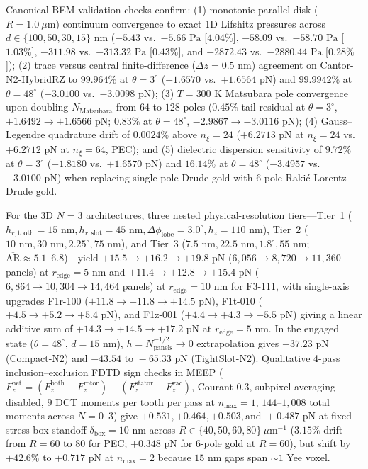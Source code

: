 \documentclass[11pt, a4paper]{article}
\begin{document}
Canonical BEM validation checks confirm: (1) monotonic parallel-disk ($R = 1.0\ \mu\text{m}$) continuum convergence to exact 1D Lifshitz pressures across $d \in \{100, 50, 30, 15\}\text{ nm}$ ($-5.43$ vs.\ $-5.66\text{ Pa}$ [$4.04\%$], $-58.09$ vs.\ $-58.70\text{ Pa}$ [$1.03\%$], $-311.98$ vs.\ $-313.32\text{ Pa}$ [$0.43\%$], and $-2872.43$ vs.\ $-2880.44\text{ Pa}$ [$0.28\%$]); (2) trace versus central finite-difference ($\Delta z = 0.5\text{ nm}$) agreement on Cantor-N2-HybridRZ to $99.964\%$ at $\theta=3^\circ$ ($+1.6570$ vs.\ $+1.6564\text{ pN}$) and $99.9942\%$ at $\theta=48^\circ$ ($-3.0100$ vs.\ $-3.0098\text{ pN}$); (3) $T=300\text{ K}$ Matsubara pole convergence upon doubling $N_{\mathrm{Matsubara}}$ from $64$ to $128$ poles ($0.45\%$ tail residual at $\theta=3^\circ$, $+1.6492 \to +1.6566\text{ pN}$; $0.83\%$ at $\theta=48^\circ$, $-2.9867 \to -3.0116\text{ pN}$); (4) Gauss--Legendre quadrature drift of $0.0024\%$ above $n_\xi = 24$ ($+6.2713\text{ pN}$ at $n_\xi=24$ vs.\ $+6.2712\text{ pN}$ at $n_\xi=64$, PEC); and (5) dielectric dispersion sensitivity of $9.72\%$ at $\theta=3^\circ$ ($+1.8180$ vs.\ $+1.6570\text{ pN}$) and $16.14\%$ at $\theta=48^\circ$ ($-3.4957$ vs.\ $-3.0100\text{ pN}$) when replacing single-pole Drude gold with 6-pole Raki\'c Lorentz--Drude gold\cite{rakic1998}.

For the 3D $N=3$ architectures, three nested physical-resolution tiers---Tier~1 ($h_{r,\mathrm{tooth}}=15\text{ nm}, h_{r,\mathrm{slot}}=45\text{ nm}, \Delta\phi_{\mathrm{lobe}}=3.0^\circ, h_z=110\text{ nm}$), Tier~2 ($10\text{ nm}, 30\text{ nm}, 2.25^\circ, 75\text{ nm}$), and Tier~3 ($7.5\text{ nm}, 22.5\text{ nm}, 1.8^\circ, 55\text{ nm}$; $\overline{\mathrm{AR}} \approx 5.1\text{--}6.8$)---yield $+15.5 \to +16.2 \to +19.8\text{ pN}$ ($6{,}056 \to 8{,}720 \to 11{,}360$ panels) at $r_{\mathrm{edge}}=5\text{ nm}$ and $+11.4 \to +12.8 \to +15.4\text{ pN}$ ($6{,}864 \to 10{,}304 \to 14{,}464$ panels) at $r_{\mathrm{edge}}=10\text{ nm}$ for F3-111, with single-axis upgrades F1r-100 ($+11.8 \to +11.8 \to +14.5\text{ pN}$), F1t-010 ($+4.5 \to +5.2 \to +5.4\text{ pN}$), and F1z-001 ($+4.4 \to +4.3 \to +5.5\text{ pN}$) giving a linear additive sum of $+14.3 \to +14.5 \to +17.2\text{ pN}$ at $r_{\mathrm{edge}}=5\text{ nm}$. In the engaged state ($\theta=48^\circ$, $d=15\text{ nm}$), $h = N_{\mathrm{panels}}^{-1/2} \to 0$ extrapolation gives $-37.23\text{ pN}$ (Compact-N2) and $-43.54\text{ to }-65.33\text{ pN}$ (TightSlot-N2). Qualitative 4-pass inclusion--exclusion FDTD sign checks in MEEP\cite{rodriguez2009pra,oskooi2010} ($F_z^{\mathrm{net}} = (F_z^{\mathrm{both}} - F_z^{\mathrm{rotor}}) - (F_z^{\mathrm{stator}} - F_z^{\mathrm{vac}})$, Courant $0.3$, subpixel averaging disabled, $9$ DCT moments per tooth per pass at $n_{\max}=1$, $144\text{--}1{,}008$ total moments across $N=0\text{--}3$) give $+0.531, +0.464, +0.503, \text{and }+0.487\text{ pN}$ at fixed stress-box standoff $\delta_{\mathrm{box}} = 10\text{ nm}$ across $R \in \{40, 50, 60, 80\}\ \mu\text{m}^{-1}$ ($3.15\%$ drift from $R=60$ to $80$ for PEC; $+0.348\text{ pN}$ for 6-pole gold at $R=60$), but shift by $+42.6\%$ to $+0.717\text{ pN}$ at $n_{\max}=2$ because $15\text{ nm}$ gaps span $\sim 1$ Yee voxel.
\end{document}
